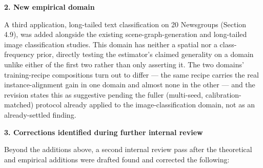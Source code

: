\documentclass[11pt,a4paper]{article}
\begin{document}
\vspace{0.5em}
\noindent\textbf{2. New empirical domain}

A third application, long-tailed text classification on 20 Newsgroups (Section 4.9),
was added alongside the existing scene-graph-generation and long-tailed image
classification studies. This domain has neither a spatial nor a class-frequency prior,
directly testing the estimator's claimed generality on a domain unlike either of the
first two rather than only asserting it. The two domains' training-recipe compositions
turn out to differ --- the same recipe carries the real instance-alignment gain in one
domain and almost none in the other --- and the revision states this as suggestive
pending the fuller (multi-seed, calibration-matched) protocol already applied to the
image-classification domain, not as an already-settled finding.

\vspace{0.5em}
\noindent\textbf{3. Corrections identified during further internal review}

Beyond the additions above, a second internal review pass after the theoretical and
empirical additions were drafted found and corrected the following:
\end{document}
